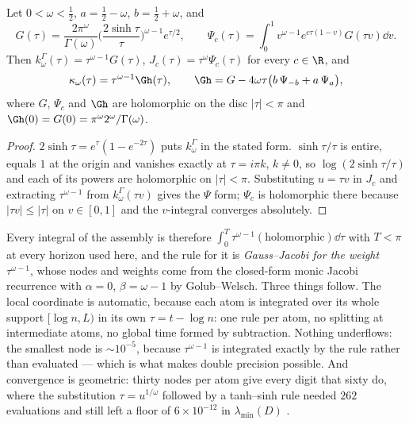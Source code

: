 \begin{proposition}\label{prop:analytic}
Let $0<\omega<\frac12$, $a=\frac12-\omega$, $b=\frac12+\omega$, and
\begin{equation}\label{eq:Ghat}
 G(\tau)=\frac{2\pi^\omega}{\Gamma(\omega)}\Big(\frac{2\sinh\tau}\tau\Big)^{\omega-1}e^{\tau/2},
 \qquad
 \Psi_c(\tau)=\int_0^1v^{\omega-1}e^{c\tau(1-v)}G(\tau v)\dd v .
\end{equation}
Then $k^\Gamma_\omega(\tau)=\tau^{\omega-1}G(\tau)$, $J_c(\tau)=\tau^\omega\Psi_c(\tau)$
for every $c\in\R$, and
\begin{equation}\label{eq:atom}
 \kappa_\omega(\tau)=\tau^{\omega-1}\Gh(\tau),\qquad
 \Gh=G-4\omega\tau\big(b\,\Psi_{-b}+a\,\Psi_a\big),
\end{equation}
where $G$, $\Psi_c$ and $\Gh$ are holomorphic on the disc $|\tau|<\pi$ and
$\Gh(0)=G(0)=\pi^\omega2^\omega/\Gamma(\omega)$.
\end{proposition}
\begin{proof}
$2\sinh\tau=e^\tau(1-e^{-2\tau})$ puts $k^\Gamma_\omega$ in the stated form.
$\sinh\tau/\tau$ is entire, equals $1$ at the origin and vanishes exactly at
$\tau=i\pi k$, $k\neq0$, so $\log(2\sinh\tau/\tau)$ and each of its powers are
holomorphic on $|\tau|<\pi$. Substituting $u=\tau v$ in $J_c$ and extracting
$\tau^{\omega-1}$ from $k^\Gamma_\omega(\tau v)$ gives the $\Psi$ form;
$\Psi_c$ is holomorphic there because $|\tau v|\leq|\tau|$ on $v\in[0,1]$ and
the $v$-integral converges absolutely.
\end{proof}

Every integral of the assembly is therefore
$\int_0^T\tau^{\omega-1}(\text{holomorphic})\dd\tau$ with $T<\pi$ at every
horizon used here, and the rule for it is \emph{Gauss--Jacobi for the weight
$\tau^{\omega-1}$}, whose nodes and weights come from the closed-form monic
Jacobi recurrence with $\alpha=0$, $\beta=\omega-1$ by Golub--Welsch. Three
things follow. The local coordinate is automatic, because each atom is
integrated over its whole support $[\log n,L)$ in its own $\tau=t-\log n$: one
rule per atom, no splitting at intermediate atoms, no global time formed by
subtraction. Nothing underflows: the smallest node is $\sim10^{-5}$, because
$\tau^{\omega-1}$ is integrated exactly by the rule rather than evaluated ---
which is what makes double precision possible. And convergence is geometric:
thirty nodes per atom give every digit that sixty do, where the substitution
$\tau=u^{1/\omega}$ followed by a tanh--sinh rule needed $262$ evaluations and
still left a floor of $6\times10^{-12}$ in $\lambda_{\min}(D)$
\cite{ContractionNote}.

